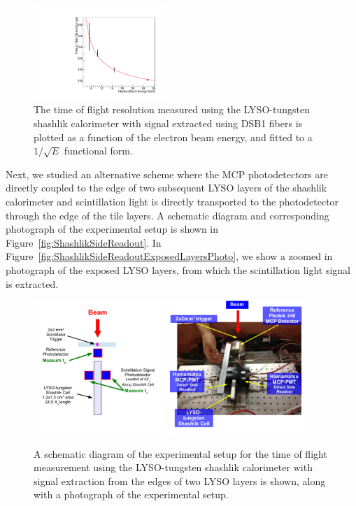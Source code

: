 \documentclass[12pt]{article}
\begin{document}
\begin{figure}[h] \centering
\includegraphics[width=0.45\textwidth]{figs/TimeResolutionVsEnergy_ShashlikDSB1Fiber} 
\caption{ The time of flight resolution measured using the LYSO-tungsten shashlik
calorimeter with signal extracted using DSB1 fibers is plotted as a function of
the electron beam energy, and fitted to a $1/\sqrt{E}$ functional form. }
\label{fig:ShashlikFiberTOFResolutionVsEnergy}
\end{figure}


Next, we studied an alternative scheme where the MCP photodetectors
are directly coupled to the edge of two subsequent LYSO layers of the
shashlik calorimeter and scintillation light is directly transported 
to the photodetector through the edge of the tile layers. 
A schematic diagram and corresponding photograph of
the experimental setup is shown in Figure~\ref{fig:ShashlikSideReadout}.
In Figure~\ref{fig:ShashlikSideReadoutExposedLayersPhoto}, we show
a zoomed in photograph of the exposed LYSO layers, from which the 
scintillation light signal is extracted.

\begin{figure}[h] \centering
\includegraphics[width=0.45\textwidth]{figs/ShashlikSideReadoutSetupSchematic} 
\includegraphics[width=0.45\textwidth]{figs/ShashlikSideReadoutPhotoB} 
\caption{ A schematic diagram of the experimental setup for the
time of flight measurement using the LYSO-tungsten shashlik calorimeter
with signal extraction from the edges of two LYSO layers is shown, along
with a photograph of the experimental setup. } 
\label{fig:ShashlikSideReadoutSetup}
\end{figure}
\end{document}
